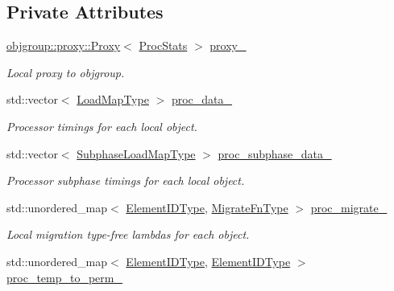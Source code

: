 \subsection*{Private Attributes}
\begin{DoxyCompactItemize}
\item 
\hyperlink{structvt_1_1objgroup_1_1proxy_1_1_proxy}{objgroup\+::proxy\+::\+Proxy}$<$ \hyperlink{structvt_1_1vrt_1_1collection_1_1balance_1_1_proc_stats}{Proc\+Stats} $>$ \hyperlink{structvt_1_1vrt_1_1collection_1_1balance_1_1_proc_stats_a117dfc074ac943a1a8493f150ff35a00}{proxy\+\_\+}
\begin{DoxyCompactList}\small\item\em Local proxy to objgroup. \end{DoxyCompactList}\item 
std\+::vector$<$ \hyperlink{namespacevt_1_1vrt_1_1collection_1_1balance_a45306ee4bf38fe3fb586d1ee2fa3d147}{Load\+Map\+Type} $>$ \hyperlink{structvt_1_1vrt_1_1collection_1_1balance_1_1_proc_stats_a62c01980c4f0eadf09dc29615301234d}{proc\+\_\+data\+\_\+}
\begin{DoxyCompactList}\small\item\em Processor timings for each local object. \end{DoxyCompactList}\item 
std\+::vector$<$ \hyperlink{namespacevt_1_1vrt_1_1collection_1_1balance_a3d91523158c1025b7b665240072f3b7e}{Subphase\+Load\+Map\+Type} $>$ \hyperlink{structvt_1_1vrt_1_1collection_1_1balance_1_1_proc_stats_a88775bda69065a391970251f5e7b3264}{proc\+\_\+subphase\+\_\+data\+\_\+}
\begin{DoxyCompactList}\small\item\em Processor subphase timings for each local object. \end{DoxyCompactList}\item 
std\+::unordered\+\_\+map$<$ \hyperlink{namespacevt_1_1vrt_1_1collection_1_1balance_a14c8d2c972f2913aa3f1636e5be0a120}{Element\+I\+D\+Type}, \hyperlink{structvt_1_1vrt_1_1collection_1_1balance_1_1_proc_stats_a7cb065ac4de218cb717bc2634782f0cb}{Migrate\+Fn\+Type} $>$ \hyperlink{structvt_1_1vrt_1_1collection_1_1balance_1_1_proc_stats_aaf05ac7876d1896f5a640dddbc5a4b60}{proc\+\_\+migrate\+\_\+}
\begin{DoxyCompactList}\small\item\em Local migration type-\/free lambdas for each object. \end{DoxyCompactList}\item 
std\+::unordered\+\_\+map$<$ \hyperlink{namespacevt_1_1vrt_1_1collection_1_1balance_a14c8d2c972f2913aa3f1636e5be0a120}{Element\+I\+D\+Type}, \hyperlink{namespacevt_1_1vrt_1_1collection_1_1balance_a14c8d2c972f2913aa3f1636e5be0a120}{Element\+I\+D\+Type} $>$ \hyperlink{structvt_1_1vrt_1_1collection_1_1balance_1_1_proc_stats_ac1df7dec2dc78042a582c5b86a4d517b}{proc\+\_\+temp\+\_\+to\+\_\+perm\+\_\+}

\end{DoxyCompactItemize}
